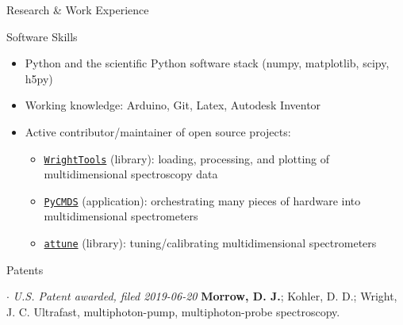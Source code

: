 \documentclass{resume} %
\begin{document}
\begin{rSection}{Research \& Work Experience}

\end{rSection}

\begin{rSection}{Software Skills}
	\begin{itemize}[leftmargin = 0 pt]
		\item Python and the scientific Python software stack (numpy, matplotlib, scipy, h5py)
		\item Working knowledge: Arduino, Git, Latex, Autodesk Inventor
		\item Active contributor/maintainer of open source projects:
		\begin{itemize}
			\item \href{http://wright.tools}{\texttt{WrightTools}} (library): loading, processing, and plotting of multidimensional spectroscopy data 
			\item \href{http://github.com/wright-group/PyCMDS}{\texttt{PyCMDS}} (application): orchestrating many pieces of hardware into multidimensional spectrometers  
			\item \href{http://github.com/wright-group/attune}{\texttt{attune}} (library): tuning/calibrating multidimensional spectrometers
		\end{itemize}
		
	\end{itemize}	
\end{rSection}


\begin{rSection}{Patents}
	\begin{etaremune}
		\item[$\cdot$] \textit{U.S. Patent awarded, filed 2019-06-20} \textbf{Morrow, D. J.}; Kohler, D. D.; Wright, J. C. Ultrafast, multiphoton-pump, multiphoton-probe spectroscopy. 		
	\end{etaremune}	
\end{rSection}
\end{document}
